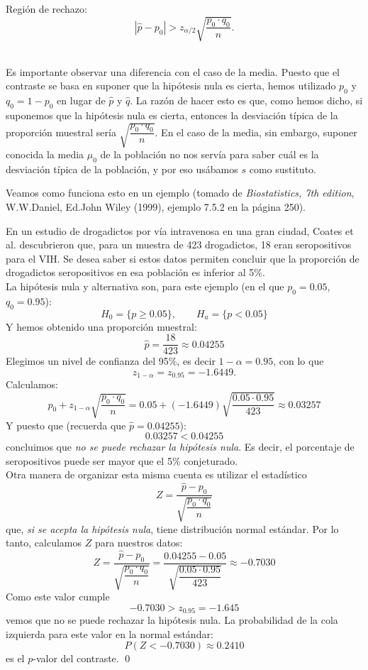 \begin{itemize}
{{\begin{minipage}{14cm}
\begin{enumerate}
            Región de rechazo:
            \[|\hat p-p_0|>z_{\alpha/2}\sqrt{\dfrac{p_0\cdot q_0}{n}}.\]
       \end{enumerate}
       \end{minipage}}}\\[3mm]
       Es importante observar una diferencia con el caso de la media. Puesto que el contraste se basa en suponer que la hipótesis nula es cierta, hemos utilizado $p_0$ y $q_0=1-p_0$ en lugar de $\hat p$ y $\hat q$. La razón de hacer esto es que, como hemos dicho, si suponemos que la hipótesis nula es cierta, entonces la desviación típica de la proporción muestral sería $\sqrt{\dfrac{p_0\cdot q_0}{n}}$. En el caso de la media, sin embargo, suponer conocida la media $\mu_0$ de la población no nos servía para saber cuál es la desviación típica de la población, y por eso usábamos $s$ como sustituto.

       Veamos como funciona esto en un ejemplo (tomado de {\em Biostatistics, 7th edition}, W.W.Daniel, Ed.John Wiley (1999), ejemplo 7.5.2 en la página 250).
       \begin{ejemplo}
       En un estudio de drogadictos por vía intravenosa en una gran ciudad, Coates et al. descubrieron que, para un muestra de 423 drogadictos, 18 eran seropositivos para el VIH. Se desea saber si estos datos permiten concluir que la proporción de drogadictos seropositivos en esa población es inferior al 5\%.\\
       La hipótesis nula y alternativa son, para este ejemplo (en el que $p_0=0.05$, $q_0=0.95$):
       \[
       H_0=\{p\geq 0.05\},\qquad H_a=\{p<0.05\}
       \]
       Y hemos obtenido una proporción muestral:
       \[\hat p=\dfrac{18}{423}\approx 0.04255\]
       Elegimos un nivel de confianza del 95\%, es decir $1-\alpha=0.95$, con lo que
       \[z_{1-\alpha}=z_{0.95}=-1.6449.\]
        Calculamos:
       \[p_0+z_{1-\alpha}\sqrt{\dfrac{p_0\cdot q_0}{n}}=0.05+(-1.6449)\sqrt{\dfrac{0.05\cdot 0.95}{423}}\approx 0.03257\]
       Y puesto que (recuerda que $\hat p=0.04255$):
       \[0.03257<0.04255\]
       concluimos que {\em no se puede rechazar la hipótesis nula}. Es decir, el porcentaje de seropositivos puede ser mayor que el 5\% conjeturado.\\

       Otra manera de organizar esta misma cuenta es utilizar el estadístico
       \[Z=\dfrac{\hat p-p_0}{\sqrt{\dfrac{p_0\cdot q_0}{n}}}\]
       que, {\em si se acepta la hipótesis nula}, tiene distribución normal estándar. Por lo tanto, calculamos $Z$ para nuestros datos:
       \[Z=\dfrac{\hat p-p_0}{\sqrt{\dfrac{p_0\cdot q_0}{n}}}=
       \dfrac{0.04255-0.05}{\sqrt{\dfrac{0.05\cdot 0.95}{423}}}\approx -0.7030
       \]
       Como este valor cumple
       \[-0.7030>z_{0.95}=-1.645\]
       vemos que no se puede rechazar la hipótesis nula.
       La probabilidad de la cola izquierda para este valor en la normal estándar:
       \[P(Z<-0.7030)\approx 0.2410\]
       es el $p$-valor del contraste. \qed
       \end{ejemplo}

    \end{itemize}


